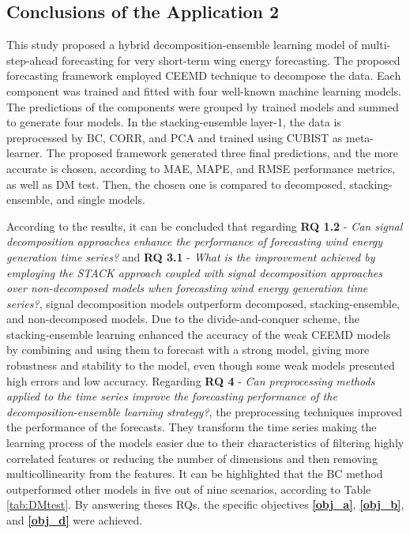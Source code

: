 \subsection{Conclusions of the Application 2}

This study proposed a hybrid decomposition-ensemble learning model of multi-step-ahead forecasting for very short-term wing energy forecasting. The proposed forecasting framework employed \ac{CEEMD} technique to decompose the data. Each component was trained and fitted with four well-known machine learning models. The predictions of the components were grouped by trained models and summed to generate four models. In the stacking-ensemble layer-1, the data is preprocessed by \ac{BC}, \ac{CORR}, and \ac{PCA} and trained using \ac{CUBIST} as meta-learner. The proposed framework generated three final predictions, and the more accurate is chosen, according to \ac{MAE}, \ac{MAPE}, and \ac{RMSE} performance metrics, as well as \ac{DM} test. Then, the chosen one is compared to decomposed, stacking-ensemble, and single models.

According to the results, it can be concluded that regarding \textbf{RQ 1.2} - \textit{Can signal decomposition approaches enhance the performance of forecasting wind energy generation time series?} and \textbf{RQ 3.1} - \textit{What is the improvement achieved by employing the \ac{STACK} approach coupled with signal decomposition approaches over non-decomposed models when forecasting wind energy generation time series?}, signal decomposition models outperform decomposed, stacking-ensemble, and non-decomposed models. Due to the divide-and-conquer scheme, the stacking-ensemble learning enhanced the accuracy of the weak \ac{CEEMD} models by combining and using them to forecast with a strong model, giving more robustness and stability to the model, even though some weak models presented high errors and low accuracy. Regarding \textbf{RQ 4} - \textit{Can preprocessing methods applied to the time series improve the forecasting performance of the decomposition-ensemble learning strategy?}, the preprocessing techniques improved the performance of the forecasts. They transform the time series making the learning process of the models easier due to their characteristics of filtering highly correlated features or reducing the number of dimensions and then removing multicollinearity from the features. It can be highlighted that the \ac{BC} method outperformed other models in five out of nine scenarios, according to Table \ref{tab:DMtest}. By answering theses \ac{RQ}s, the specific objectives \textbf{\ref{obj_a}}, \textbf{\ref{obj_b}}, and \textbf{\ref{obj_d}} were achieved.